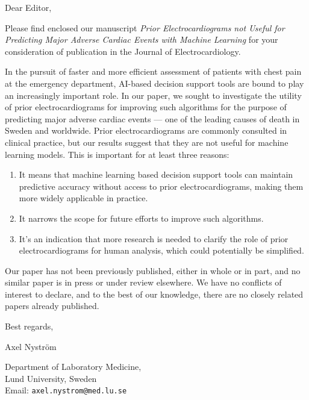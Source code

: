 \documentclass[a4paper,10pt]{letter}
\begin{document}
\pagestyle{empty}
Dear Editor,

Please find enclosed our manuscript \textit{Prior Electrocardiograms not Useful for Predicting Major Adverse Cardiac Events with Machine Learning} for your consideration of publication in the Journal of Electrocardiology.

In the pursuit of faster and more efficient assessment of patients with chest pain at the emergency department, AI-based decision support tools are bound to play an increasingly important role. In our paper, we sought to investigate the utility of prior electrocardiograms for improving such algorithms for the purpose of predicting major adverse cardiac events --- one of the leading causes of death in Sweden and worldwide. Prior electrocardiograms are commonly consulted in clinical practice, but our results suggest that they are not useful for machine learning models. This is important for at least three reasons:

\begin{enumerate}
  \item It means that machine learning based decision support tools can maintain predictive accuracy without access to prior electrocardiograms, making them more widely applicable in practice.
  \item It narrows the scope for future efforts to improve such algorithms.
  \item It's an indication that more research is needed to clarify the role of prior electrocardiograms for human analysis, which could potentially be simplified.
\end{enumerate}

Our paper has not been previously published, either in whole or in part, and no similar paper is in press or under review elsewhere. We have no conflicts of interest to declare, and to the best of our knowledge, there are no closely related papers already published.

Best regards,

Axel Nyström

Department of Laboratory Medicine,\\
Lund University, Sweden\\
Email: \texttt{axel.nystrom@med.lu.se}
\end{document}
